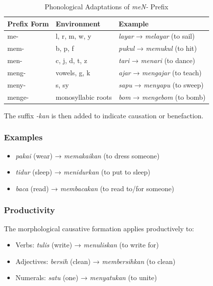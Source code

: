 \documentclass[12pt,a4paper]{article}
\begin{document}
\begin{table}[h]
\centering
\caption{Phonological Adaptations of \textit{meN-} Prefix}
\label{tab:malay_prefix}
\begin{tabular}{|l|l|l|}
\hline
\textbf{Prefix Form} & \textbf{Environment} & \textbf{Example} \\
\hline
me- & l, r, m, w, y & \textit{layar} → \textit{melayar} (to sail) \\
mem- & b, p, f & \textit{pukul} → \textit{memukul} (to hit) \\
men- & c, j, d, t, z & \textit{tari} → \textit{menari} (to dance) \\
meng- & vowels, g, k & \textit{ajar} → \textit{mengajar} (to teach) \\
meny- & s, sy & \textit{sapu} → \textit{menyapu} (to sweep) \\
menge- & monosyllabic roots & \textit{bom} → \textit{mengebom} (to bomb) \\
\hline
\end{tabular}
\end{table}

The suffix \textit{-kan} is then added to indicate causation or benefaction.

\subsubsection{Examples}
\begin{itemize}
\item \textit{pakai} (wear) → \textit{memakaikan} (to dress someone)
\item \textit{tidur} (sleep) → \textit{menidurkan} (to put to sleep)
\item \textit{baca} (read) → \textit{membacakan} (to read to/for someone)
\end{itemize}

\subsubsection{Productivity}
The morphological causative formation applies productively to:
\begin{itemize}
\item Verbs: \textit{tulis} (write) → \textit{menuliskan} (to write for)
\item Adjectives: \textit{bersih} (clean) → \textit{membersihkan} (to clean)
\item Numerals: \textit{satu} (one) → \textit{menyatukan} (to unite)
\end{itemize}
\end{document}
